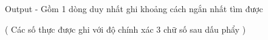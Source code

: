 Output  
- Gồm 1 dòng duy nhất ghi khoảng cách ngắn nhất tìm được  

   ( Các số thực được ghi với độ chính xác 3 chữ số sau dấu phẩy )